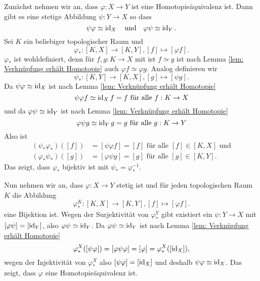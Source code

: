 \documentclass[a4paper,10pt]{article}
\begin{document}
Zunächst nehmen wir an, dass $\varphi : X \to Y$ ist eine Homotopieäquivalenz ist. Dann gibt es eine stetige Abbildung $\psi : Y \to X$ so dass
\[
 \psi \varphi \simeq \operatorname{id}_X \quad \text{und} \quad \varphi \psi \simeq \operatorname{id}_Y.
\]
Sei $K$ ein beliebiger topologischer Raum und
\[
 \varphi_* : [K,X] \to [K,Y], [f] \mapsto [\varphi f].
\]
$\varphi_*$ ist wohldefiniert, denn für $f,g : K \to X$ mit ist $f \simeq g$ ist nach Lemma \ref{lem: Verknüpfung erhält Homotopie} auch $\varphi f \simeq \varphi g$. Analog definieren wir
\[
 \psi_* : [K,Y] \to [K,X], [g] \mapsto [\psi g].
\]
Da $\psi \varphi \simeq \operatorname{id}_X$ ist nach Lemma \ref{lem: Verknüpfung erhält Homotopie}
\[
 \psi \varphi f \simeq \operatorname{id}_X f = f \text{ für alle } f : K \to X
\]
und da $\varphi \psi \simeq \operatorname{id}_Y$ ist nach Lemma \ref{lem: Verknüpfung erhält Homotopie}
\[
 \varphi \psi g \simeq \operatorname{id}_Y g = g \text{ für alle } g : K \to Y
\]
Also ist
\begin{align*}
 (\psi_* \varphi_*)([f]) &= [\psi \varphi f] = [f] \text{ für alle } [f] \in [K,X] \text{ und}\\
 (\varphi_* \psi_*)([g]) &= [\varphi \psi g] = [g] \text{ für alle } [g] \in [K,Y].
\end{align*}
Das zeigt, dass $\varphi_*$ bijektiv ist mit $\psi_* = \varphi_*^{-1}$.

Nun nehmen wir an, dass $\varphi : X \to Y$ stetig ist und für jeden topologischen Raum $K$ die Abbildung
\[
 \varphi^K_* : [K,X] \to [K,Y], [f] \mapsto [\varphi f].
\]
eine Bijektion ist. Wegen der Surjektivität von $\varphi_*^Y$ gibt existiert ein $\psi : Y \to X$ mit \mbox{$[\varphi \psi] = [\operatorname{id}_Y]$}, also $\varphi \psi \simeq \operatorname{id}_Y$. Da $\varphi \psi \simeq \operatorname{id}_Y$ ist nach Lemma \ref{lem: Verknüpfung erhält Homotopie}
\[
 \varphi_*^X([\psi \varphi]) = [\varphi \psi \varphi] = [\varphi] = \varphi_*^X([\operatorname{id}_X]),
\]
wegen der Injektivität von $\varphi_*^X$ also $[\psi \varphi] = [\operatorname{id}_X]$ und deshalb $\psi \varphi \simeq \operatorname{id}_X$. Das zeigt, dass $\varphi$ eine Homotopieäquivalenz ist.
\end{document}
